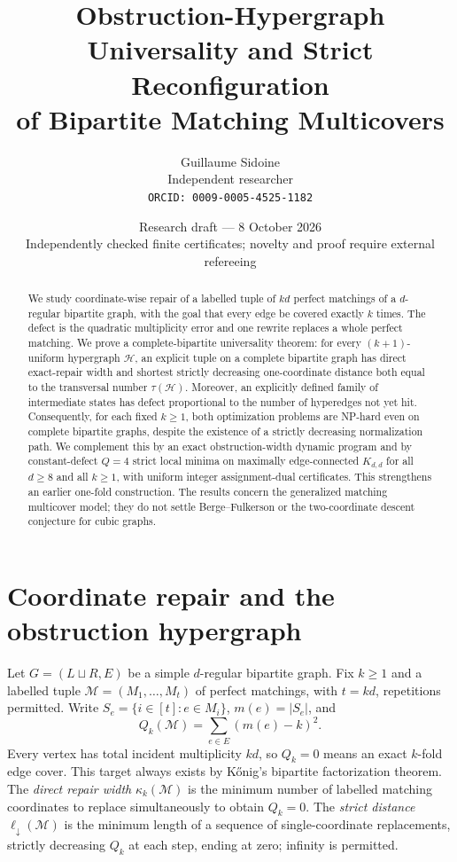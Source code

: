 \documentclass[10pt]{article}
\title{Obstruction-Hypergraph Universality and Strict Reconfiguration\\of Bipartite Matching Multicovers}
\author{Guillaume Sidoine\\Independent researcher\\\texttt{ORCID: 0009-0005-4525-1182}}
\date{Research draft --- 8 October 2026\\\small Independently checked finite certificates; novelty and proof require external refereeing}
\newcommand{\M}{\mathcal M}
\newcommand{\Hh}{\mathcal H}
\newcommand{\kc}{\kappa_k}
\newcommand{\ellstr}{\ell_\downarrow}
\begin{document}
\maketitle
\begin{abstract}
We study coordinate-wise repair of a labelled tuple of $kd$ perfect matchings of a $d$-regular bipartite graph, with the goal that every edge be covered exactly $k$ times. The defect is the quadratic multiplicity error and one rewrite replaces a whole perfect matching. We prove a complete-bipartite universality theorem: for every $(k+1)$-uniform hypergraph $\Hh$, an explicit tuple on a complete bipartite graph has direct exact-repair width and shortest strictly decreasing one-coordinate distance both equal to the transversal number $\tau(\Hh)$. Moreover, an explicitly defined family of intermediate states has defect proportional to the number of hyperedges not yet hit. Consequently, for each fixed $k\ge1$, both optimization problems are NP-hard even on complete bipartite graphs, despite the existence of a strictly decreasing normalization path. We complement this by an exact obstruction-width dynamic program and by constant-defect $Q=4$ strict local minima on maximally edge-connected $K_{d,d}$ for all $d\ge8$ and all $k\ge1$, with uniform integer assignment-dual certificates. This strengthens an earlier one-fold construction. The results concern the generalized matching multicover model; they do not settle Berge--Fulkerson or the two-coordinate descent conjecture for cubic graphs.
\end{abstract}

\section{Coordinate repair and the obstruction hypergraph}
Let $G=(L\sqcup R,E)$ be a simple $d$-regular bipartite graph. Fix $k\ge1$ and a labelled tuple $\M=(M_1,\ldots,M_t)$ of perfect matchings, with $t=kd$, repetitions permitted. Write $S_e=\{i\in[t]:e\in M_i\}$, $m(e)=|S_e|$, and
\[Q_k(\M)=\sum_{e\in E}(m(e)-k)^2.\]
Every vertex has total incident multiplicity $kd$, so $Q_k=0$ means an exact $k$-fold edge cover. This target always exists by K\H{o}nig's bipartite factorization theorem. The \emph{direct repair width} $\kc(\M)$ is the minimum number of labelled matching coordinates to replace simultaneously to obtain $Q_k=0$. The \emph{strict distance} $\ellstr(\M)$ is the minimum length of a sequence of single-coordinate replacements, strictly decreasing $Q_k$ at each step, ending at zero; infinity is permitted.
\end{document}
